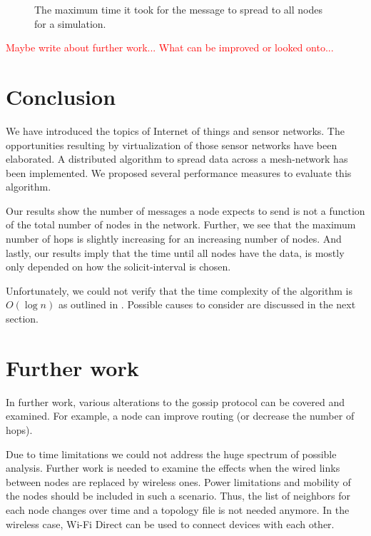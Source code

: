 \documentclass[12pt,journal]{IEEEtran}
\begin{document}
\begin{figure}
 \centering
 \caption{The maximum time it took for the message to spread to all nodes for a simulation.}
 \label{fig:maxtime}
\end{figure}

\textcolor{red}{Maybe write about further work... What can be improved or looked onto...}

\section{Conclusion}
We have introduced the topics of Internet of things and sensor networks. The opportunities resulting by virtualization of those sensor networks have been elaborated. A distributed algorithm to spread data across a mesh-network has been implemented. We proposed several performance measures to evaluate this algorithm.

Our results show the number of messages a node expects to send is not a function of the total number of nodes in the network. Further, we see that the maximum number of hops is slightly increasing for an increasing number of nodes. And lastly, our results imply that the time until all nodes have the data, is mostly only depended on how the solicit-interval is chosen.

Unfortunately, we could not verify that the time complexity of the algorithm is $O(\log n)$ as outlined in \cite{gossip}. Possible causes to consider are discussed in the next section.

\section{Further work}
In further work, various alterations to the gossip protocol can be covered and examined. For example, a node can improve routing (or decrease the number of hops). 


Due to time limitations we could not address the huge spectrum of possible analysis. Further work is needed to examine the effects when the wired links between nodes are replaced by wireless ones. Power limitations and mobility of the nodes should be included in such a scenario. Thus, the list of neighbors for each node changes over time and a topology file is not needed anymore. In the wireless case, Wi-Fi Direct can be used to connect devices with each other.

\end{document}
